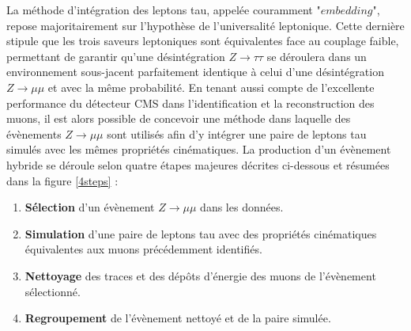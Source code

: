 La méthode d'intégration des leptons tau, appelée couramment $\textit{"embedding"}$, repose majoritairement sur l'hypothèse de l'universalité leptonique. Cette dernière stipule que les trois saveurs leptoniques sont équivalentes face au couplage faible, permettant de garantir qu'une désintégration $Z\rightarrow\tau\tau$ se déroulera dans un environnement sous-jacent parfaitement identique à celui d'une désintégration $Z\rightarrow\mu\mu$ et avec la même probabilité. En tenant aussi compte de l'excellente performance du détecteur CMS dans l'identification et la reconstruction des muons, il est alors possible de concevoir une méthode dans laquelle des évènements $Z\rightarrow\mu\mu$ sont utilisés afin d'y intégrer une paire de leptons tau simulés avec les mêmes propriétés cinématiques. La production d'un évènement hybride se déroule selon quatre étapes majeures décrites ci-dessous et résumées dans la figure \ref{4steps} :

\begin{enumerate}
    \medskip
    \item \textbf{Sélection} d'un évènement $Z\rightarrow\mu\mu$ dans les données.
    \medskip
    \item \textbf{Simulation} d'une paire de leptons tau avec des propriétés cinématiques équivalentes aux muons précédemment identifiés.
    \medskip
    \item \textbf{Nettoyage} des traces et des dépôts d'énergie des muons de l'évènement sélectionné.
    \medskip
    \item \textbf{Regroupement} de l'évènement nettoyé et de la paire simulée.
    \medskip
\end{enumerate}


